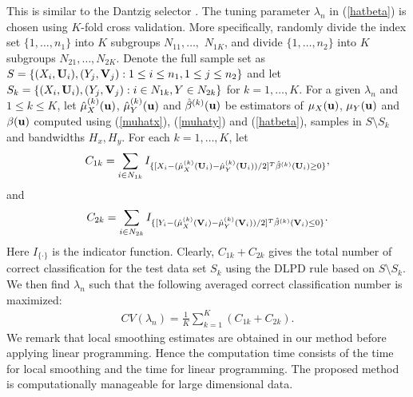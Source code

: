 \documentclass[11pt]{article}
\theoremstyle{definition}
\begin{document}
 This is similar to  the Dantzig selector \citep{candes,Cai}. The tuning parameter
 $\lambda_n$ in (\ref{hatbeta}) is chosen using $K$-fold cross
 validation. More specifically, randomly divide the index set
 $\{1,\ldots,n_1\}$ into $K$ subgroups $N_{11},\ldots,$ $ N_{1K}$, and
 divide $\{1,\ldots,n_2\}$ into $K$ subgroups $N_{21},\ldots,N_{2K}$.
 Denote the full sample set as $S=\{(X_i,{\bf U}_i),(Y_j,{\bf V}_j): 1\leq i\leq n_1, 1\leq
 j\leq n_2\}$ and let $S_k=\{(X_i,{\bf U}_i),(Y_j,{\bf V}_j): i\in N_{1k},Y\in N_{2k}\}$ for
 $k=1,\ldots, K$. For a given $\lambda_n$ and  $1\leq k\leq K$, let $\hat{\mu}^{(k)}_X({\bf u})$, $\hat{\mu}^{(k)}_Y({\bf u})$ and $\hat{\beta}^{(k)}({\bf u})$ be estimators of $\mu_X({\bf u})$, $\mu_Y({\bf u})$ and $\beta({\bf u})$ computed using (\ref{muhatx}), (\ref{muhaty}) and (\ref{hatbeta}), samples in $S\setminus S_k$ and bandwidths $H_x, H_y$. For each
 $k=1,\ldots, K$, let
 \[ C_{1k}=\sum_{i\in
 	N_{1k}}I_{\{ [X_i-(\hat{\mu}^{(k)}_X({\bf U}_i)-\hat{\mu}^{(k)}_Y({\bf U}_i))/2]^T\hat{\beta}^{(k)}({\bf U}_i)\geq 0\}},\]
 and
 \[C_{2k}=\sum_{i\in
 	N_{2k}}I_{\{ [Y_i-(\hat{\mu}^{(k)}_X({\bf V}_i)-\hat{\mu}^{(k)}_Y({\bf V}_i))/2]^T\hat{\beta}^{(k)}({\bf V}_i)\leq 0\}}.\]
 Here $I_{\{\cdot\}}$ is the indicator function. Clearly,
 $C_{1k}+C_{2k}$ gives the total number of correct classification for
 the test data set $S_k$ using the DLPD rule based on $S\setminus
 S_k$. We then find $\lambda_n$ such that the following averaged
 correct classification number is maximized:
 \begin{eqnarray*}
 	CV(\lambda_n)=\frac{1}{K}\sum_{k=1}^K(C_{1k}+C_{2k}).
 \end{eqnarray*}
 We remark that %
 local smoothing estimates are obtained in our method before applying linear programming. Hence the computation time consists of the time for local smoothing and the time for linear programming.  The proposed method is computationally manageable for large dimensional data. %
 
 
\end{document}
